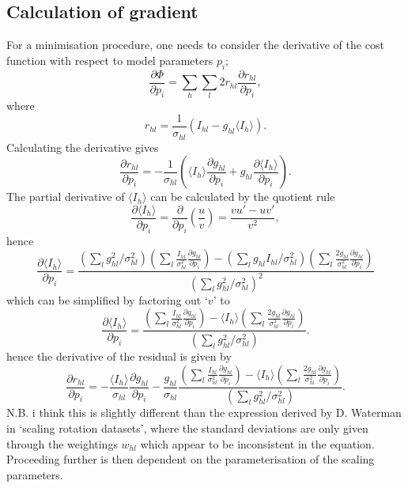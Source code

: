 \documentclass[11pt, oneside]{article}   	%
\begin{document}
\subsection{Calculation of gradient}
For a minimisation procedure, one needs to consider the derivative of the cost function with respect to model parameters $p_i$;
\begin{equation}
\frac{\partial \Phi}{\partial p_i} = \sum_h \sum_l 2 r_{hl} \frac{\partial r_{hl}}{\partial p_i},
\end{equation}
where
\begin{equation}
r_{hl} = \frac{1}{\sigma_{hl}} (I_{hl} - g_{hl} \langle I_h \rangle).
\end{equation}
Calculating the derivative gives
\begin{equation}
\frac{\partial r_{hl}}{\partial p_i} = -\frac{1}{\sigma_{hl}}( \langle I_{h} \rangle \frac{\partial g_{hl}}{\partial p_i} 
+  g_{hl} \frac{\partial \langle I_{h} \rangle}{\partial p_i} ).
\end{equation}
The partial derivative of $\langle I_h \rangle$ can be calculated by the quotient rule
\begin{equation}
\frac{\partial \langle I_{h} \rangle}{\partial p_i} = \frac{\partial}{\partial p_i}(\frac{u}{v}) = \frac{v u' - u v'}{v^2},
\end{equation}
hence
\begin{equation}
\frac{\partial \langle I_{h} \rangle}{\partial p_i} = \frac{(\sum_l g^2_{hl} /\sigma^2_{hl}) (\sum_l  \frac{I_{hl}}{\sigma^2_{hl} }\frac{\partial g_{hl}}{\partial p_i})  -  (\sum_l g_{hl} I_{hl}/\sigma^2_{hl})  (\sum_l \frac{2g_{hl}}{\sigma^2_{hl}} \frac{\partial g_{hl}}{\partial p_i} )        }{ (\sum_l g^2_{hl} /\sigma^2_{hl})^2 } 
\end{equation}
which can be simplified by factoring out `$v$' to
\begin{equation}
\frac{\partial \langle I_{h} \rangle}{\partial p_i}  = \frac{ (\sum_l  \frac{I_{hl}}{\sigma^2_{hl} }\frac{\partial g_{hl}}{\partial p_i})  -   \langle I_{h} \rangle  (\sum_l \frac{2g_{hl}}{\sigma^2_{hl}} \frac{\partial g_{hl}}{\partial p_i} )        }{ (\sum_l g^2_{hl} /\sigma^2_{hl}) }.
\end{equation}
hence the derivative of the residual is given by
\begin{equation}
\frac{\partial r_{hl}}{\partial p_i} = - \frac{\langle I_{h} \rangle}{\sigma_{hl}} \frac{\partial g_{hl}}{\partial p_i} 
-  \frac{g_{hl}}{\sigma_{hl}}     \frac{ (\sum_l  \frac{I_{hl}}{\sigma^2_{hl} }\frac{\partial g_{hl}}{\partial p_i})  -   \langle I_{h} \rangle  (\sum_l \frac{2g_{hl}}{\sigma^2_{hl}} \frac{\partial g_{hl}}{\partial p_i} )        }{ (\sum_l g^2_{hl} /\sigma^2_{hl}) } .
\end{equation}
{\color{red} N.B. i think this is slightly different than the expression derived by D. Waterman in `scaling rotation datasets', where the standard deviations are only given through the weightings $w_{hl}$ which appear to be inconsistent in the equation.}
Proceeding further is then dependent on the parameterisation of the scaling parameters.
\end{document}
